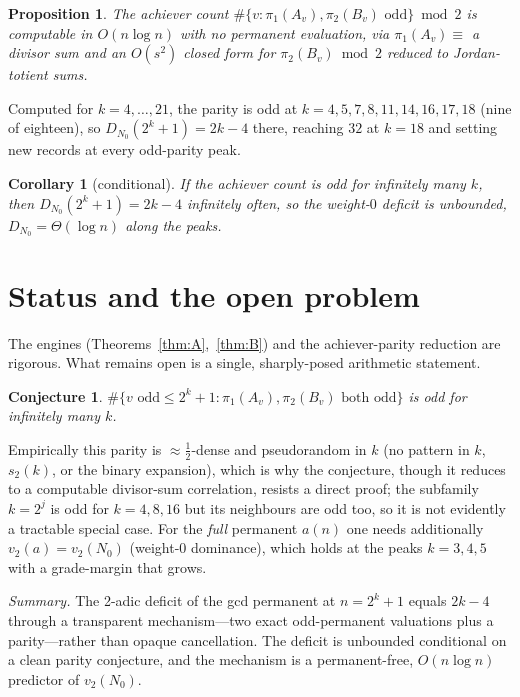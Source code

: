 \documentclass[11pt]{article}
\newtheorem{proposition}[theorem]{Proposition}
\newtheorem{corollary}[theorem]{Corollary}
\newtheorem{conjecture}[theorem]{Conjecture}
\theoremstyle{remark}\newtheorem{remark}[theorem]{Remark}
\newcommand{\vtwo}{v_2}
\begin{document}
\begin{proposition}
The achiever count $\#\{v:\pi_1(A_v),\pi_2(B_v)\text{ odd}\}\bmod 2$ is computable in $O(n\log n)$ with
no permanent evaluation, via $\pi_1(A_v)\equiv$ a divisor sum and an $O(s^2)$ closed form for
$\pi_2(B_v)\bmod2$ reduced to Jordan-totient sums.
\end{proposition}

Computed for $k=4,\dots,21$, the parity is odd at $k=4,5,7,8,11,14,16,17,18$ (nine of eighteen), so
$D_{N_0}(2^k+1)=2k-4$ there, reaching $32$ at $k=18$ and setting new records at every odd-parity peak.

\begin{corollary}[conditional]
If the achiever count is odd for infinitely many $k$, then $D_{N_0}(2^k+1)=2k-4$ infinitely often, so
the weight-$0$ deficit is unbounded, $D_{N_0}=\Theta(\log n)$ along the peaks.
\end{corollary}

\section{Status and the open problem}

The engines (Theorems~\ref{thm:A},~\ref{thm:B}) and the achiever-parity reduction are rigorous. What
remains open is a single, sharply-posed arithmetic statement.
\begin{conjecture}
$\#\{v\text{ odd}\le 2^k+1:\pi_1(A_v),\pi_2(B_v)\text{ both odd}\}$ is odd for infinitely many $k$.
\end{conjecture}
Empirically this parity is $\approx\tfrac12$-dense and pseudorandom in $k$ (no pattern in $k$,
$s_2(k)$, or the binary expansion), which is why the conjecture, though it reduces to a computable
divisor-sum correlation, resists a direct proof; the subfamily $k=2^j$ is odd for $k=4,8,16$ but its
neighbours are odd too, so it is not evidently a tractable special case. For the \emph{full}
permanent $a(n)$ one needs additionally $\vtwo(a)=\vtwo(N_0)$ (weight-$0$ dominance), which holds at
the peaks $k=3,4,5$ with a grade-margin that grows.

\medskip\noindent\emph{Summary.} The 2-adic deficit of the gcd permanent at $n=2^k+1$ equals $2k-4$
through a transparent mechanism---two exact odd-permanent valuations plus a parity---rather than
opaque cancellation. The deficit is unbounded conditional on a clean parity conjecture, and the
mechanism is a permanent-free, $O(n\log n)$ predictor of $\vtwo(N_0)$.
\end{document}
